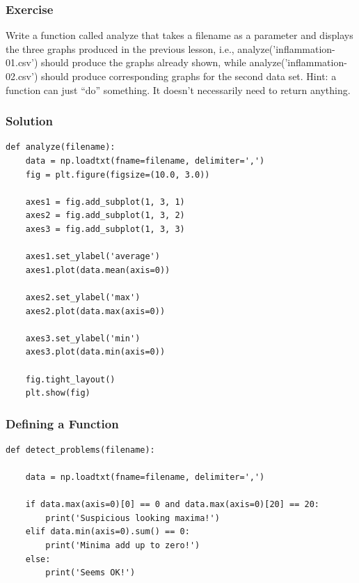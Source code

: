 \documentclass{beamer}
\begin{document}
\begin{frame}
\frametitle{Exercise}
Write a function called analyze that takes a filename as a parameter and displays the three graphs produced in the previous lesson, i.e., analyze('inflammation-01.csv') should produce the graphs already shown, while analyze('inflammation-02.csv') should produce corresponding graphs for the second data set. Hint: a function can just ``do'' something.  It doesn't necessarily need to return anything.
\end{frame}

\begin{frame}[fragile]
\frametitle{Solution}
\small{
\begin{verbatim}
def analyze(filename):
    data = np.loadtxt(fname=filename, delimiter=',')
    fig = plt.figure(figsize=(10.0, 3.0))

    axes1 = fig.add_subplot(1, 3, 1)
    axes2 = fig.add_subplot(1, 3, 2)
    axes3 = fig.add_subplot(1, 3, 3)

    axes1.set_ylabel('average')
    axes1.plot(data.mean(axis=0))

    axes2.set_ylabel('max')
    axes2.plot(data.max(axis=0))

    axes3.set_ylabel('min')
    axes3.plot(data.min(axis=0))

    fig.tight_layout()
    plt.show(fig)
\end{verbatim}}
\end{frame}


\begin{frame}[fragile]
\frametitle{Defining a Function}
\begin{verbatim}
def detect_problems(filename):

    data = np.loadtxt(fname=filename, delimiter=',')

    if data.max(axis=0)[0] == 0 and data.max(axis=0)[20] == 20:
        print('Suspicious looking maxima!')
    elif data.min(axis=0).sum() == 0:
        print('Minima add up to zero!')
    else:
        print('Seems OK!')
\end{verbatim}
\end{frame}
\end{document}
